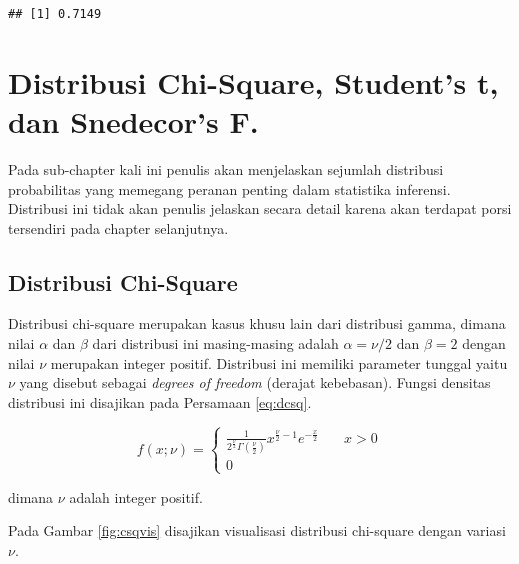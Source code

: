 \documentclass[]{book}
\begin{document}
\begin{verbatim}
## [1] 0.7149
\end{verbatim}

\section{Distribusi Chi-Square, Student's t, dan Snedecor's
F.}\label{distribusi-chi-square-students-t-dan-snedecors-f.}

Pada sub-chapter kali ini penulis akan menjelaskan sejumlah distribusi
probabilitas yang memegang peranan penting dalam statistika inferensi.
Distribusi ini tidak akan penulis jelaskan secara detail karena akan
terdapat porsi tersendiri pada chapter selanjutnya.

\subsection{Distribusi Chi-Square}\label{distribusi-chi-square}

Distribusi chi-square merupakan kasus khusu lain dari distribusi gamma,
dimana nilai \(\alpha\) dan \(\beta\) dari distribusi ini masing-masing
adalah \(\alpha=\nu/2\) dan \(\beta=2\) dengan nilai \(\nu\) merupakan
integer positif. Distribusi ini memiliki parameter tunggal yaitu \(\nu\)
yang disebut sebagai \emph{degrees of freedom} (derajat kebebasan).
Fungsi densitas distribusi ini disajikan pada Persamaan \eqref{eq:dcsq}.

\begin{equation}
f\left(x;\nu \right) =
  \begin{cases}
    \frac{1}{2^{\frac{\nu}{2}}\Gamma\left(\frac{\nu}{2}\right)}x^{\frac{\nu}{2}-1}e^{-\frac{x}{2}}       & \quad x>0\\
    0                   & \quad\text{}
    \end{cases}
 \label{eq:dcsq}
\end{equation}

dimana \(\nu\) adalah integer positif.

Pada Gambar \ref{fig:csqvis} disajikan visualisasi distribusi chi-square
dengan variasi \(\nu\).
\end{document}
